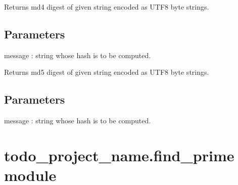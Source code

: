 \documentclass[letterpaper,10pt,english]{sphinxmanual}
\begin{document}
\begin{fulllineitems}
\label{\detokenize{todo_project_name:todo_project_name.core.md4_string}}
\pysigstartsignatures
{}
\pysigstopsignatures
\sphinxAtStartPar
Returns md4 digest of given string encoded as UTF\sphinxhyphen{}8 byte strings.


\subsection{Parameters}
\label{\detokenize{todo_project_name:parameters}}
\sphinxAtStartPar
message
: string whose hash is to be computed.

\end{fulllineitems}


\begin{fulllineitems}
\label{\detokenize{todo_project_name:todo_project_name.core.md5_string}}
\pysigstartsignatures
{}
\pysigstopsignatures
\sphinxAtStartPar
Returns md5 digest of given string encoded as UTF\sphinxhyphen{}8 byte strings.


\subsection{Parameters}
\label{\detokenize{todo_project_name:id1}}
\sphinxAtStartPar
message
: string whose hash is to be computed.

\end{fulllineitems}



\section{todo\_project\_name.find\_prime module}
\label{\detokenize{todo_project_name:module-todo_project_name.find_prime}}\label{\detokenize{todo_project_name:todo-project-name-find-prime-module}}
\end{document}
